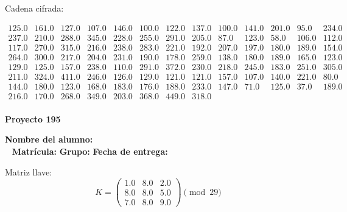\documentclass[12pt]{article}
\begin{document}
Cadena cifrada:
\begin{center}
$\begin{array}{lllllllllllll}
125.0 & 161.0 & 127.0 & 107.0 & 146.0 & 100.0 & 122.0 & 137.0 & 100.0 & 141.0 & 201.0 & 95.0 & 234.0\\
237.0 & 210.0 & 288.0 & 345.0 & 228.0 & 255.0 & 291.0 & 205.0 & 87.0 & 123.0 & 58.0 & 106.0 & 112.0\\
117.0 & 270.0 & 315.0 & 216.0 & 238.0 & 283.0 & 221.0 & 192.0 & 207.0 & 197.0 & 180.0 & 189.0 & 154.0\\
264.0 & 300.0 & 217.0 & 204.0 & 231.0 & 190.0 & 178.0 & 259.0 & 138.0 & 180.0 & 189.0 & 165.0 & 123.0\\
129.0 & 125.0 & 157.0 & 238.0 & 110.0 & 291.0 & 372.0 & 230.0 & 218.0 & 245.0 & 183.0 & 251.0 & 305.0\\
211.0 & 324.0 & 411.0 & 246.0 & 126.0 & 129.0 & 121.0 & 121.0 & 157.0 & 107.0 & 140.0 & 221.0 & 80.0\\
144.0 & 180.0 & 123.0 & 168.0 & 183.0 & 176.0 & 188.0 & 233.0 & 147.0 & 71.0 & 125.0 & 37.0 & 189.0\\
216.0 & 170.0 & 268.0 & 349.0 & 203.0 & 368.0 & 449.0 & 318.0\\
\end{array}$
\end{center}

\newpage


\textbf{Proyecto 195}

\textbf{Nombre del alumno:} \underline{\hspace{13cm}}\\\
\vspace{1cm}
\textbf{Matrícula:} \underline{\hspace{4cm}} \hspace{1cm}
\textbf{Grupo:} \underline{\hspace{2cm}}
\textbf{Fecha de entrega:} \underline{\hspace{2cm}}

\medskip

Matriz llave:
\[
K = \begin{pmatrix}
1.0 & 8.0 & 2.0\\
8.0 & 8.0 & 5.0\\
7.0 & 8.0 & 9.0
\end{pmatrix} \pmod{29}
\]
\end{document}
